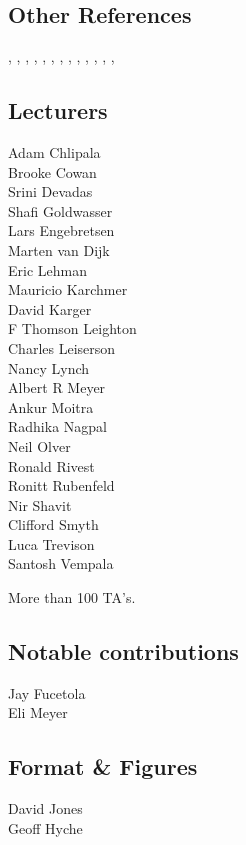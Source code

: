 \subsection*{Other References}

\cite{Apostol67},
\cite{Beam17},
\cite{Berkeley75},
\cite{Chow98},
\cite{Fagin95},
\cite{GareyJohnson},
\cite{Gelfond34},
\cite{Malkiel03},
\cite{Meyer69},
\cite{MichaelsR91},
\cite{Paterson09},
\cite{Stockmeyer73},
\cite{Stueben98},


\subsection*{Lecturers}

Adam Chlipala\\
Brooke Cowan\\
Srini Devadas\\
Shafi Goldwasser\\
Lars Engebretsen\\
Marten van Dijk\\
Eric Lehman\\
Mauricio Karchmer\\
David Karger\\
F Thomson Leighton\\
Charles Leiserson\\
Nancy Lynch\\
Albert R Meyer\\
Ankur Moitra\\
Radhika Nagpal\\
Neil Olver\\
Ronald Rivest\\
Ronitt Rubenfeld\\
Nir Shavit\\
Clifford Smyth\\
Luca Trevison\\
Santosh Vempala

More than 100 TA's.

\subsection*{Notable contributions}

Jay Fucetola\\
Eli Meyer

\subsection*{Format \& Figures}
David Jones\\
Geoff Hyche

\endinput
